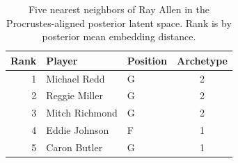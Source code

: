 \begin{table}[htbp]
  \centering\small
  \begin{tabular}{rllc}
    \toprule
    Rank & Player & Position & Archetype \\
    \midrule
    1 & Michael Redd & G & 2 \\
    2 & Reggie Miller & G & 2 \\
    3 & Mitch Richmond & G & 2 \\
    4 & Eddie Johnson & F & 1 \\
    5 & Caron Butler & G & 1 \\
    \bottomrule
  \end{tabular}
  \caption{Five nearest neighbors of Ray Allen in the Procrustes-aligned posterior latent space. Rank is by posterior mean embedding distance.}
  \label{tab:Ray_Allen_neighbors}
\end{table}

